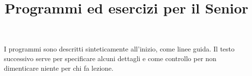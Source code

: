 \documentclass[a4paper,10pt]{article}
\title{Programmi ed esercizi per il Senior}
\date{}
\begin{document}
\maketitle


I programmi sono descritti sinteticamente all'inizio, come linee guida. Il testo successivo serve per specificare alcuni dettagli e come controllo per non dimenticare niente per chi fa lezione. 

\vspace{1cm}
 
 
 
 
 
\end{document}
